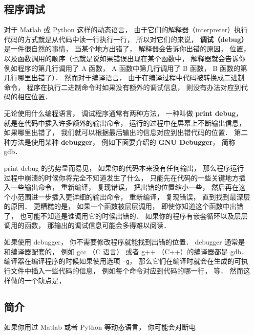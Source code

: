 
\subsection{程序调试}

对于 Matlab 或 Python 这样的动态语言， 由于它们的解释器（interpreter）执行代码的方式就是从代码中读一行执行一行， 所以对它们的来说， \textbf{调试（debug）}是一件很自然的事情， 当某个地方出错了， 解释器会告诉你出错的原因， 位置， 以及函数调用的顺序（也就是说如果错误出现在某个函数中， 解释器就会告诉你例如程序的第几行调用了 A 函数， A 函数中第几行调用了 B 函数， B 函数的第几行哪里出错了）． 然而对于编译语言， 由于在编译过程中代码被转换成二进制命令， 程序在执行二进制命令时如果没有额外的调试信息， 则没有办法对应到代码的相应位置．

无论使用什么编程语言， 调试程序通常有两种方法， 一种叫做 \textbf{print debug}， 就是在代码中插入许多额外的输出命令， 运行的过程中在屏幕上不断输出信息， 如果哪里出错了， 我们就可以根据最后输出的信息对应到出错代码的位置． 第二种方法是使用某种 \textbf{debugger}， 例如下面要介绍的 \textbf{GNU Debugger}， 简称 gdb．

print debug 的劣势显而易见， 如果你的代码本来没有任何输出， 那么程序运行过程中崩溃的时候你将完全不知道发生了什么， 只能先在代码的一些关键地方插入一些输出命令， 重新编译， 复现错误， 把出错的位置缩小一些， 然后再在这个小范围进一步插入更详细的输出命令， 重新编译， 复现错误， 直到找到最深层的原因． 更糟糕的是， 如果一个函数被层层调用， 即使你知道这个函数中出错了， 也可能不知道是谁调用它的时候出错的． 如果你的程序有嵌套循环以及层层调用的函数， 那输出的调试信息可能会多得难以阅读．

如果使用 debugger， 你不需要修改程序就能找到出错的位置． debugger 通常是和编译器配套的， 例如 gcc （C 语言） 或者 g++ （C++）的编译器都是 gdb． 编译器在编译程序的时候如果使用选项 \verb|-g|， 那么它们在编译时就会在生成的可执行文件中插入一些代码的信息， 例如每个命令对应到代码的哪一行， 等． 然而这样做的一个缺点是， 

\subsection{简介}
如果你用过 Matlab 或者 Python 等动态语言， 你可能会对断电
